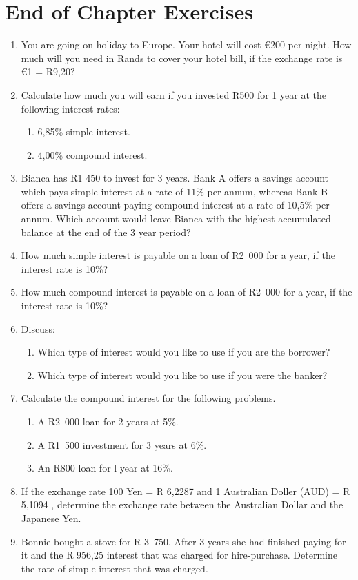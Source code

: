 \documentclass[10pt,a4paper,titlepage,twoside,openright]{report}
\begin{document}
\section{End of Chapter Exercises}
\begin{enumerate}[topsep=0ex, partopsep=0.5ex,itemsep=0.5ex]
\item{You are going on holiday to Europe. Your hotel will cost \euro200 per night. How much will you need in Rands to cover your hotel bill, if the exchange rate is \euro1 = R9,20?}
\item{Calculate how much you will earn if you invested R500 for 1 year at the following interest rates:
\begin{enumerate}[topsep=0ex, partopsep=\parskip,itemsep=\parskip]
\item{6,85\% simple interest.}
\item{4,00\% compound interest.}
\end{enumerate}}
\item{Bianca has R1 450 to invest for 3 years. Bank A offers a savings account which pays simple interest at a rate of 11\% per annum, whereas Bank B offers a savings account paying compound interest at a rate of 10,5\% per annum. Which account would leave Bianca with the highest accumulated balance at the end of the 3 year period?}
\item{How much simple interest is payable on a loan of R2~000 for a year, if the interest rate is 10\%?}
\item{How much compound interest is payable on a loan of R2~000 for a year, if the interest rate is 10\%?}
\item{Discuss:
\begin{enumerate}[topsep=0ex, partopsep=\parskip,itemsep=\parskip]
\item Which type of interest would you like to use if you are the borrower?
\item Which type of interest would you like to use if you were the banker?
\end{enumerate}}
\item{Calculate the compound interest for the following problems.
\begin{enumerate}[topsep=0ex, partopsep=\parskip,itemsep=\parskip]
\item A R2~000 loan for 2 years at 5\%.
\item A R1~500 investment for 3 years at 6\%.
\item An R800 loan for l year at 16\%.
\end{enumerate}}
\item{If the exchange rate 100 Yen = R 6,2287 and 1 Australian Doller (AUD) = R 5,1094 , determine the exchange rate between  the Australian Dollar and the Japanese Yen.}
\item{Bonnie bought a stove for R 3~750.  After 3 years she had finished paying for it and the R 956,25 interest that was charged for hire-purchase.  Determine the rate of simple interest that was charged.}
\end{enumerate}
\end{document}
